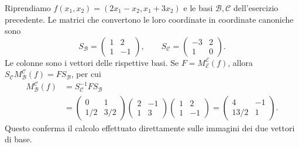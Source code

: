\begin{esempio}
Riprendiamo $f(x_1,x_2)=(2x_1-x_2,x_1+3x_2)$ e le basi $\mathcal B,\mathcal C$ dell'esercizio precedente. Le matrici che convertono le loro coordinate in coordinate canoniche sono
\[
 S_{\mathcal B}=\begin{pmatrix}1&2\\1&-1\end{pmatrix},\qquad
 S_{\mathcal C}=\begin{pmatrix}-3&2\\1&0\end{pmatrix}.
\]
Le colonne sono i vettori delle rispettive basi. Se $F=M_{\mathcal E}^{\mathcal E}(f)$, allora $S_{\mathcal C}M_{\mathcal B}^{\mathcal C}(f)=FS_{\mathcal B}$, per cui
\begin{align*}
 M_{\mathcal B}^{\mathcal C}(f)
 &=S_{\mathcal C}^{-1}FS_{\mathcal B}\\
 &=\begin{pmatrix}0&1\\1/2&3/2\end{pmatrix}
   \begin{pmatrix}2&-1\\1&3\end{pmatrix}
   \begin{pmatrix}1&2\\1&-1\end{pmatrix}
 =\begin{pmatrix}4&-1\\13/2&1\end{pmatrix}.
\end{align*}
Questo conferma il calcolo effettuato direttamente sulle immagini dei due vettori di base.
\end{esempio}
